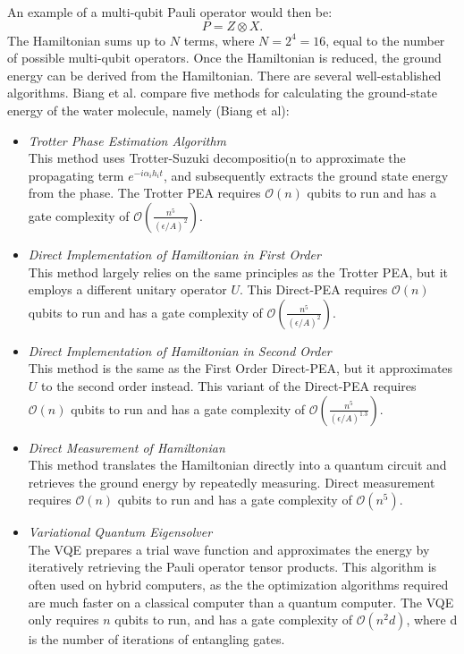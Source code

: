 \documentclass{article}
\begin{document}
An example of a multi-qubit Pauli operator would then be: $$ P = Z \otimes X.$$
The Hamiltonian sums up to $N$ terms, where $N = 2^4 = 16$, equal to the number of possible multi-qubit operators. Once the Hamiltonian is reduced, the ground energy can be derived from the Hamiltonian. There are several well-established algorithms. Biang et al. compare five methods for calculating the ground-state energy of the water molecule, namely (Biang et al):

\begin{itemize}
  \item \emph{Trotter Phase Estimation Algorithm}
  \\ This method uses Trotter-Suzuki decompositio(n to approximate  the propagating term $ e^{-i \alpha_{i} h_{i} t}$, and subsequently extracts the ground state energy from the phase. The Trotter PEA requires $\mathcal{O}(n)$ qubits to run and has a gate complexity of $\mathcal{O}(\frac{n^{5}}{(\epsilon / A)^{2}}).$
  \item \emph{Direct Implementation of Hamiltonian in First Order}
  \\This method largely relies on the same principles as the Trotter PEA, but it employs a different unitary operator $U$. This Direct-PEA requires $\mathcal{O}(n)$ qubits to run and has a gate complexity of $\mathcal{O}(\frac{n^{5}}{(\epsilon / A)^{2}}).$
  \item \emph{Direct Implementation of Hamiltonian in Second Order}
  \\This method is the same as the First Order Direct-PEA, but it approximates $U$ to the second order instead. This variant of the Direct-PEA requires $\mathcal{O}(n)$ qubits to run and has a gate complexity of $\mathcal{O}(\frac{n^{5}}{(\epsilon / A)^{1.3}}).$
  \item \emph{Direct Measurement of Hamiltonian}
  \\This method translates the Hamiltonian directly into a quantum circuit and retrieves the ground energy by repeatedly measuring. Direct measurement requires $\mathcal{O}(n)$ qubits to run and has a gate complexity of $\mathcal{O}(n^{5}).$
  \item \emph{Variational Quantum Eigensolver}
  \\The VQE prepares a trial wave function and approximates the energy by iteratively retrieving the Pauli operator tensor products. This algorithm is often used on hybrid computers, as the the optimization algorithms required are much faster on a classical computer than a quantum computer. The VQE only requires $n$ qubits to run, and has a gate complexity of $\mathcal{O}(n^{2} d)$, where d is the number of iterations of entangling gates.

\end{itemize}
\end{document}
